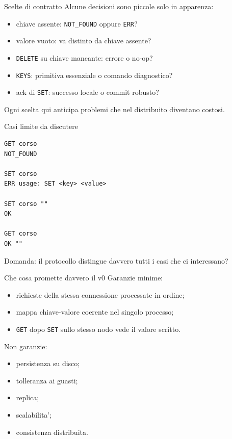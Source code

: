 \documentclass[aspectratio=169]{beamer}
\begin{document}
\begin{frame}{Scelte di contratto}
  Alcune decisioni sono piccole solo in apparenza:

  \begin{itemize}
    \item chiave assente: \texttt{NOT\_FOUND} oppure \texttt{ERR}?
    \item valore vuoto: va distinto da chiave assente?
    \item \texttt{DELETE} su chiave mancante: errore o no-op?
    \item \texttt{KEYS}: primitiva essenziale o comando diagnostico?
    \item ack di \texttt{SET}: successo locale o commit robusto?
  \end{itemize}

  Ogni scelta qui anticipa problemi che nel distribuito diventano costosi.
\end{frame}

\begin{frame}[fragile]{Casi limite da discutere}
  \begin{lstlisting}
GET corso
NOT_FOUND

SET corso
ERR usage: SET <key> <value>

SET corso ""
OK

GET corso
OK ""
  \end{lstlisting}

  Domanda: il protocollo distingue davvero tutti i casi che ci interessano?
\end{frame}

\begin{frame}{Che cosa promette davvero il v0}
  Garanzie minime:

  \begin{itemize}
    \item richieste della stessa connessione processate in ordine;
    \item mappa chiave-valore coerente nel singolo processo;
    \item \texttt{GET} dopo \texttt{SET} sullo stesso nodo vede il valore scritto.
  \end{itemize}

  Non garanzie:

  \begin{itemize}
    \item persistenza su disco;
    \item tolleranza ai guasti;
    \item replica;
    \item scalabilita';
    \item consistenza distribuita.
  \end{itemize}
\end{frame}
\end{document}
